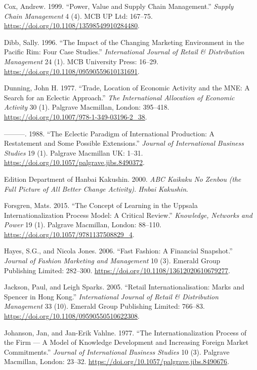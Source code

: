 \documentclass[12pt,a4paper]{article}
\begin{document}
\leavevmode\hypertarget{ref-innovative2}{}%
Cox, Andrew. 1999. ``Power, Value and Supply Chain Management.''
\emph{Supply Chain Management} 4 (4). MCB UP Ltd: 167--75.
\url{https://doi.org/10.1108/13598549910284480}.

\leavevmode\hypertarget{ref-innovative8}{}%
Dibb, Sally. 1996. ``The Impact of the Changing Marketing Environment in
the Pacific Rim: Four Case Studies.'' \emph{International Journal of
Retail \& Distribution Management} 24 (1). MCB University Press: 16--29.
\url{https://doi.org/10.1108/09590559610131691}.

\leavevmode\hypertarget{ref-innovative9}{}%
Dunning, John H. 1977. ``Trade, Location of Economic Activity and the
MNE: A Search for an Eclectic Approach.'' \emph{The International
Allocation of Economic Activity} 30 (1). Palgrave Macmillan, London:
395--418. \url{https://doi.org/10.1007/978-1-349-03196-2_38}.

\leavevmode\hypertarget{ref-innovative10}{}%
---------. 1988. ``The Eclectic Paradigm of International Production: A
Restatement and Some Possible Extensions.'' \emph{Journal of
International Business Studies} 19 (1). Palgrave Macmillan UK: 1--31.
\url{https://doi.org/10.1057/palgrave.jibs.8490372}.

\leavevmode\hypertarget{ref-innovative3}{}%
Edition Department of Hanbai Kakushin. 2000. \emph{ABC Kaikaku No Zenbou
(the Full Picture of All Better Change Activity)}. \emph{Hnbai
Kakushin}.

\leavevmode\hypertarget{ref-innovative11}{}%
Forsgren, Mats. 2015. ``The Concept of Learning in the Uppsala
Internationalization Process Model: A Critical Review.''
\emph{Knowledge, Networks and Power} 19 (1). Palgrave Macmillan, London:
88--110. \url{https://doi.org/10.1057/9781137508829_4}.

\leavevmode\hypertarget{ref-innovative12}{}%
Hayes, S.G., and Nicola Jones. 2006. ``Fast Fashion: A Financial
Snapshot.'' \emph{Journal of Fashion Marketing and Management} 10 (3).
Emerald Group Publishing Limited: 282--300.
\url{https://doi.org/10.1108/13612020610679277}.

\leavevmode\hypertarget{ref-innovative13}{}%
Jackson, Paul, and Leigh Sparks. 2005. ``Retail Internationalisation:
Marks and Spencer in Hong Kong.'' \emph{International Journal of Retail
\& Distribution Management} 33 (10). Emerald Group Publishing Limited:
766--83. \url{https://doi.org/10.1108/09590550510622308}.

\leavevmode\hypertarget{ref-innovative14}{}%
Johanson, Jan, and Jan-Erik Vahlne. 1977. ``The Internationalization
Process of the Firm --- A Model of Knowledge Development and Increasing
Foreign Market Commitments.'' \emph{Journal of International Business
Studies} 10 (3). Palgrave Macmillan, London: 23--32.
\url{https://doi.org/10.1057/palgrave.jibs.8490676}.
\end{document}
